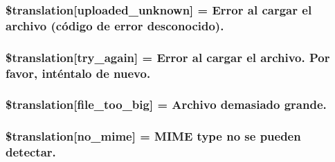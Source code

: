 \subsubsection[{\$translation}]{\setlength{\rightskip}{0pt plus 5cm}\$translation\mbox{[}\textquotesingle{}uploaded\+\_\+unknown\textquotesingle{}\mbox{]} = \textquotesingle{}Error al cargar el archivo (código de error desconocido).\textquotesingle{}}\label{class_8upload_8es___e_s_8php_a4a9168e922b827e6a28b5db1c00774ca}
\hypertarget{class_8upload_8es___e_s_8php_a3afc377bd803683314f413a814243066}{}
\subsubsection[{\$translation}]{\setlength{\rightskip}{0pt plus 5cm}\$translation\mbox{[}\textquotesingle{}try\+\_\+again\textquotesingle{}\mbox{]} = \textquotesingle{}Error al cargar el archivo. Por favor, inténtalo de nuevo.\textquotesingle{}}\label{class_8upload_8es___e_s_8php_a3afc377bd803683314f413a814243066}
\hypertarget{class_8upload_8es___e_s_8php_a476278eb4a0c3df56af068e2d511a741}{}
\subsubsection[{\$translation}]{\setlength{\rightskip}{0pt plus 5cm}\$translation\mbox{[}\textquotesingle{}file\+\_\+too\+\_\+big\textquotesingle{}\mbox{]} = \textquotesingle{}Archivo demasiado grande.\textquotesingle{}}\label{class_8upload_8es___e_s_8php_a476278eb4a0c3df56af068e2d511a741}
\hypertarget{class_8upload_8es___e_s_8php_a191a55df8e3bb7f3c51b70f3c1932e02}{}
\subsubsection[{\$translation}]{\setlength{\rightskip}{0pt plus 5cm}\$translation\mbox{[}\textquotesingle{}no\+\_\+mime\textquotesingle{}\mbox{]} = \textquotesingle{}M\+I\+M\+E type no se pueden detectar.\textquotesingle{}}\label{class_8upload_8es___e_s_8php_a191a55df8e3bb7f3c51b70f3c1932e02}
\hypertarget{class_8upload_8es___e_s_8php_a4d32343e2699edd6fd435f9c832cb9c7}{}
